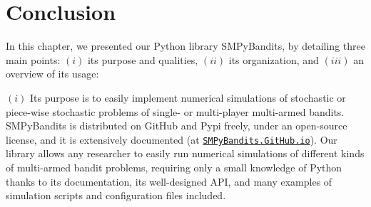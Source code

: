 






\section{Conclusion}
\label{sec:3:conclusion}


In this chapter, we presented our Python library SMPyBandits, by detailing three main points:
$(i)$ its purpose and qualities,
$(ii)$ its organization,
and $(iii)$ an overview of its usage:
%

$(i)$
Its purpose is to easily implement numerical simulations of stochastic or piece-wise stochastic problems of single- or multi-player multi-armed bandits.
SMPyBandits is distributed on GitHub and Pypi freely, under an open-source license, and it is extensively documented (at \href{https://SMPyBandits.GitHub.io}{\texttt{SMPyBandits.GitHub.io}}).
Our library allows any researcher to easily run numerical simulations of different kinds of multi-armed bandit problems, requiring only a small knowledge of Python thanks to its documentation, its well-designed API, and many examples of simulation scripts and configuration files included.

